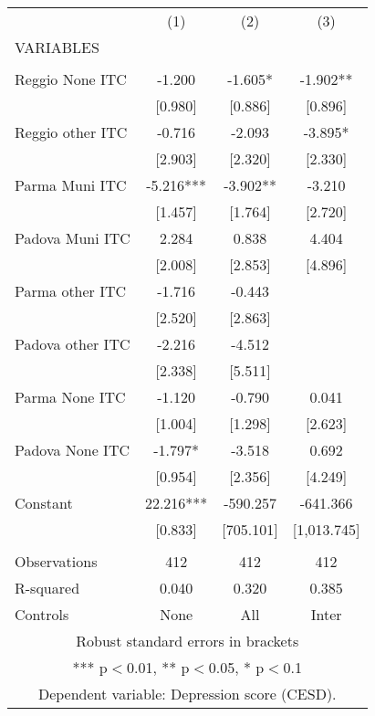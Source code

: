 \begin{tabular}{lccc} \hline
 & (1) & (2) & (3) \\
VARIABLES &  &  &  \\ \hline
 &  &  &  \\
Reggio None ITC & -1.200 & -1.605* & -1.902** \\
 & [0.980] & [0.886] & [0.896] \\
Reggio other ITC & -0.716 & -2.093 & -3.895* \\
 & [2.903] & [2.320] & [2.330] \\
Parma Muni ITC & -5.216*** & -3.902** & -3.210 \\
 & [1.457] & [1.764] & [2.720] \\
Padova Muni ITC & 2.284 & 0.838 & 4.404 \\
 & [2.008] & [2.853] & [4.896] \\
Parma other ITC & -1.716 & -0.443 &  \\
 & [2.520] & [2.863] &  \\
Padova other ITC & -2.216 & -4.512 &  \\
 & [2.338] & [5.511] &  \\
Parma None ITC & -1.120 & -0.790 & 0.041 \\
 & [1.004] & [1.298] & [2.623] \\
Padova None ITC & -1.797* & -3.518 & 0.692 \\
 & [0.954] & [2.356] & [4.249] \\
Constant & 22.216*** & -590.257 & -641.366 \\
 & [0.833] & [705.101] & [1,013.745] \\
 &  &  &  \\
Observations & 412 & 412 & 412 \\
R-squared & 0.040 & 0.320 & 0.385 \\
 Controls & None & All & Inter \\ \hline
\multicolumn{4}{c}{ Robust standard errors in brackets} \\
\multicolumn{4}{c}{ *** p$<$0.01, ** p$<$0.05, * p$<$0.1} \\
\multicolumn{4}{c}{ Dependent variable: Depression score (CESD).} \\
\end{tabular}
